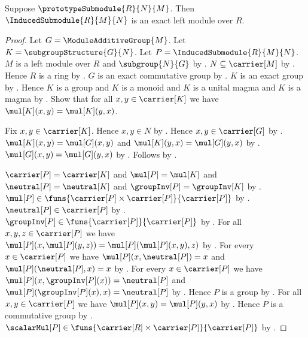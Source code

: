 \begin{theorem}\label{spike_induced_submodule_is_exact}
    Suppose $\prototypeSubmodule{R}{N}{M}$.
    Then $\InducedSubmodule{R}{M}{N}$ is an exact left module over $R$.
\end{theorem}
\begin{proof}
    Let $G=\ModuleAdditiveGroup{M}$.
    Let $K=\subgroupStructure{G}{N}$.
    Let $P=\InducedSubmodule{R}{M}{N}$.
    $M$ is a left module over $R$ and $\subgroup{N}{G}$ by
        .
    $N\subseteq\carrier[M]$ by
        .
    Hence $R$ is a ring by .
    $G$ is an exact commutative group by
        .
    $K$ is an exact group by
        .
    Hence $K$ is a group and $K$ is a monoid and
        $K$ is a unital magma and $K$ is a magma by
        .
    Show that for all $x,y\in\carrier[K]$ we have
        $\mul[K](x,y)=\mul[K](y,x)$.
    \begin{subproof}
        Fix $x,y\in\carrier[K]$.
        Hence $x,y\in N$ by .
        Hence $x,y\in\carrier[G]$ by
            .
        $\mul[K](x,y)=\mul[G](x,y)$ and
            $\mul[K](y,x)=\mul[G](y,x)$ by
            .
        $\mul[G](x,y)=\mul[G](y,x)$ by
            .
        Follows by \auto.
    \end{subproof}
    $\carrier[P]=\carrier[K]$ and $\mul[P]=\mul[K]$ and
        $\neutral[P]=\neutral[K]$ and
        $\groupInv[P]=\groupInv[K]$ by
        .
    $\mul[P]\in\funs{\carrier[P]\times\carrier[P]}{\carrier[P]}$ by
        .
    $\neutral[P]\in\carrier[P]$ by .
    $\groupInv[P]\in\funs{\carrier[P]}{\carrier[P]}$ by
        .
    For all $x,y,z\in\carrier[P]$ we have
        $\mul[P](x,\mul[P](y,z))=\mul[P](\mul[P](x,y),z)$ by
        .
    For every $x\in\carrier[P]$ we have
        $\mul[P](x,\neutral[P])=x$ and
        $\mul[P](\neutral[P],x)=x$ by
        .
    For every $x\in\carrier[P]$ we have
        $\mul[P](x,\groupInv[P](x))=\neutral[P]$ and
        $\mul[P](\groupInv[P](x),x)=\neutral[P]$ by
        .
    Hence $P$ is a group by
        .
    For all $x,y\in\carrier[P]$ we have
        $\mul[P](x,y)=\mul[P](y,x)$ by \auto.
    Hence $P$ is a commutative group by
        .
    $\scalarMul[P]\in
        \funs{\carrier[R]\times\carrier[P]}{\carrier[P]}$ by
        .


\end{proof}
